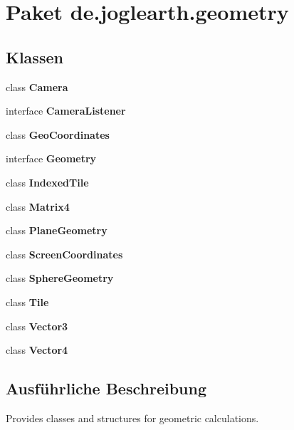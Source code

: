 \section{Paket de.\-joglearth.\-geometry}
\label{namespacede_1_1joglearth_1_1geometry}
\subsection*{Klassen}
\begin{DoxyCompactItemize}
\item 
class {\bf Camera}
\item 
interface {\bf Camera\-Listener}
\item 
class {\bf Geo\-Coordinates}
\item 
interface {\bf Geometry}
\item 
class {\bf Indexed\-Tile}
\item 
class {\bf Matrix4}
\item 
class {\bf Plane\-Geometry}
\item 
class {\bf Screen\-Coordinates}
\item 
class {\bf Sphere\-Geometry}
\item 
class {\bf Tile}
\item 
class {\bf Vector3}
\item 
class {\bf Vector4}
\end{DoxyCompactItemize}


\subsection{Ausführliche Beschreibung}
Provides classes and structures for geometric calculations. 